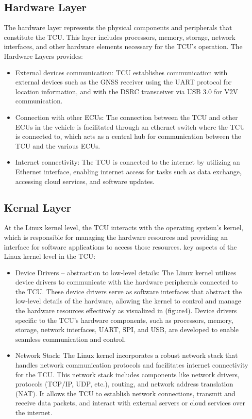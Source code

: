 \documentclass[
12pt,
oneside, 
onehalfspacing, 
nolistspacing, 
parskip, 
chapterinoneline, 
]{AASTCOMPUTER}
\begin{document}
\subsection{Hardware Layer}
The hardware layer represents the physical components and peripherals that constitute the TCU. This layer includes processors, memory, storage, network interfaces, and other hardware elements necessary for the TCU's operation.
The Hardware Layers provides:
    \begin{itemize}
      \item External devices communication: TCU establishes communication with external devices such as the GNSS receiver using the UART protocol for location information, and with the DSRC transceiver via USB 3.0 for V2V communication. 
      \item Connection with other ECUs: The connection between the TCU and other ECUs in the vehicle is facilitated through an ethernet switch where the TCU is connected to, which acts as a central hub for communication between the TCU and the various ECUs.
      \item Internet connectivity: The TCU is connected to the internet by utilizing an Ethernet interface, enabling internet access for tasks such as data exchange, accessing cloud services, and software updates.
    \end{itemize}
\subsection{Kernal Layer}
    At the Linux kernel level, the TCU interacts with the operating system's kernel, which is responsible for managing the hardware resources and providing an interface for software applications to access those resources. key aspects of the Linux kernel level in the TCU:
    \begin{itemize}
  \item Device Drivers – abstraction to low-level details: The Linux kernel utilizes device drivers to communicate with the hardware peripherals connected to the TCU. These device drivers serve as software interfaces that abstract the low-level details of the hardware, allowing the kernel to control and manage the hardware resources effectively as visualized in (figure4). Device drivers specific to the TCU's hardware components, such as processors, memory, storage, network interfaces, UART, SPI, and USB, are developed to enable seamless communication and control.
  \item Network Stack: The Linux kernel incorporates a robust network stack that handles network communication protocols and facilitates internet connectivity for the TCU. This network stack includes components like network drivers, protocols (TCP/IP, UDP, etc.), routing, and network address translation (NAT). It allows the TCU to establish network connections, transmit and receive data packets, and interact with external servers or cloud services over the internet.
\end{itemize}
\end{document}
